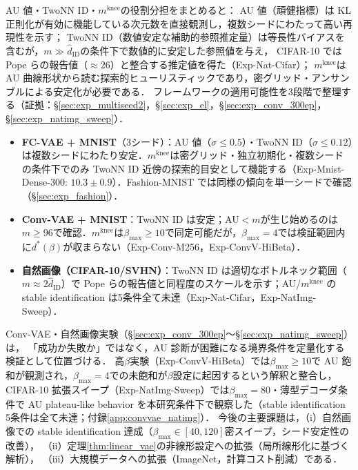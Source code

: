 \documentclass[11pt,a4paper]{jsarticle}
\newcommand{\mknee}{m^{\mathrm{knee}}}
\begin{document}
AU 値・TwoNN ID・$\mknee$の役割分担をまとめると：
AU 値（頑健指標）は KL 正則化が有効に機能している次元数を直接観測し，複数シードにわたって高い再現性を示す；
TwoNN ID（数値安定な補助的参照推定量）は等長性バイアスを含むが，$m \gg \hat{d}_\mathrm{ID}$の条件下で数値的に安定した参照値を与え，
CIFAR-10 では Pope ら\cite{pope2021intrinsic}の報告値（$\approx 26$）と整合する推定値を得た（Exp-Nat-Cifar）；
$\mknee$は AU 曲線形状から読む探索的ヒューリスティックであり，密グリッド・アンサンブルによる安定化が必要である．
フレームワークの適用可能性を3段階で整理する（証拠：§\ref{sec:exp_multiseed2}，§\ref{sec:exp_el}，§\ref{sec:exp_conv_300ep}，§\ref{sec:exp_natimg_sweep}）．
\begin{itemize}
  \item \textbf{FC-VAE + MNIST}（3シード）：AU 値（$\sigma\leq0.5$）・TwoNN ID（$\sigma\leq0.12$）は複数シードにわたり安定．$\mknee$は密グリッド・独立初期化・複数シードの条件下でのみ TwoNN ID 近傍の探索的目安として機能する（Exp-Mnist-Dense-300: $10.3\pm0.9$）．Fashion-MNIST では同様の傾向を単一シードで確認（§\ref{sec:exp_fashion}）．
  \item \textbf{Conv-VAE + MNIST}：TwoNN ID は安定；AU$<m$が生じ始めるのは$m\geq96$で確認．$\mknee$は$\beta_{\max}\geq10$で同定可能だが，$\beta_{\max}=4$では検証範囲内に$d^*(\beta)$が収まらない（Exp-Conv-M256，Exp-ConvV-HiBeta）．
  \item \textbf{自然画像（CIFAR-10/SVHN）}：TwoNN ID は適切なボトルネック範囲（$m\approx2\hat{d}_\mathrm{ID}$）で Pope ら\cite{pope2021intrinsic}の報告値と同程度のスケールを示す；AU/$\mknee$ の stable identification は5条件全て未達（Exp-Nat-Cifar，Exp-NatImg-Sweep）．
\end{itemize}

Conv-VAE・自然画像実験（§\ref{sec:exp_conv_300ep}〜§\ref{sec:exp_natimg_sweep}）は，
「成功か失敗か」ではなく，AU 診断が困難になる境界条件を定量化する検証として位置づける．
高$\beta$実験（Exp-ConvV-HiBeta）では$\beta_{\max} \geq 10$で AU 飽和が観測され，$\beta_{\max}=4$での未飽和が$\beta$設定に起因するという解釈と整合し，
CIFAR-10 拡張スイープ（Exp-NatImg-Sweep）では$\beta_{\max}=80$・薄型デコーダ条件で
AU plateau-like behavior を本研究条件下で観察した（stable identification 5条件は全て未達；付録\ref{app:convvae_natimg}）．
今後の主要課題は，（i）自然画像での stable identification 達成（$\beta_{\max} \in [40,120]$密スイープ，シード安定性の改善），
（ii）定理\ref{thm:linear_vae}の非線形設定への拡張（局所線形化に基づく解析），
（iii）大規模データへの拡張（ImageNet，計算コスト削減）である．
\end{document}
